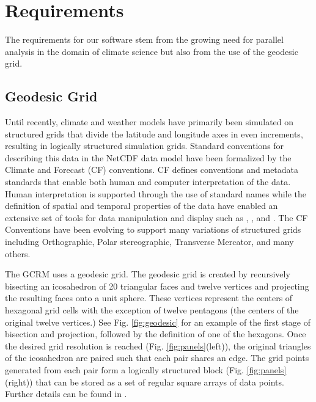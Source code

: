\section{Requirements}
\label{section:requirements}

The requirements for our software stem from the growing need for parallel
analysis in the domain of climate science\cite{MODSIM07:LOT} but also from the
use of the geodesic grid.

\subsection{Geodesic Grid}
\label{subsection:grid}

Until recently, climate and weather models have primarily been simulated on
structured grids that divide the latitude and longitude axes in even
increments, resulting in logically structured simulation grids.  Standard
conventions for describing this data in the NetCDF data model have been
formalized by the Climate and Forecast (CF) conventions\cite{CF}.  CF defines
conventions and metadata standards that enable both human and computer
interpretation of the data.  Human interpretation is supported through the use
of standard names while the definition of spatial and temporal properties of
the data have enabled an extensive set of tools for data manipulation and
display such as \cite{NCO}, \cite{OPeNDAP}, and \cite{FERRET}.  The CF
Conventions have been evolving to support many variations of structured grids
including Orthographic, Polar stereographic, Transverse Mercator, and many
others. 

The GCRM uses a geodesic grid.  The geodesic grid is created by recursively
bisecting an icosahedron of 20 triangular faces and twelve vertices and
projecting the resulting faces onto a unit sphere.  These vertices represent
the centers of hexagonal grid cells with the exception of twelve pentagons
(the centers of the original twelve vertices.) See Fig.  \ref{fig:geodesic}
for an example of the first stage of bisection and projection, followed by the
definition of one of the hexagons.  Once the desired grid resolution is
reached (Fig. \ref{fig:panels}(left)), the original triangles of the
icosahedron are paired such that each pair shares an edge. The grid points
generated from each pair form a logically structured block (Fig.
\ref{fig:panels}(right)) that can be stored as a set of regular square arrays
of data points.  Further details can be found in \cite{GEODESIC}.

